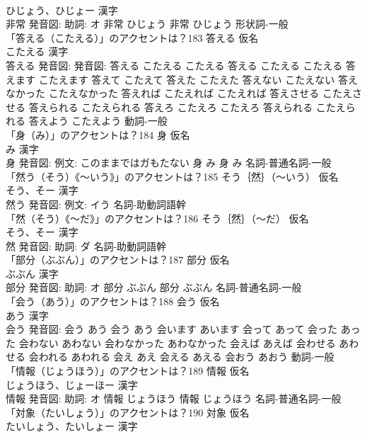 \documentclass[8pt]{extreport}
\begin{document}
\begin{CJK}{UTF8}{min}
\\	ひじょう、ひじょー 漢字　
\\	非常 発音図: 助詞: オ	非常 ひじょう		非常 ひじょう				形状詞-一般 
\\	「答える（こたえる）」のアクセントは？183	答える 仮名　
\\	こたえる 漢字　
\\	答える 発音図: 発音図:	答える こたえる こたえる		答える こたえる こたえる 答えます こたえます 答えて こたえて 答えた こたえた 答えない こたえない 答えなかった こたえなかった 答えれば こたえれば こたえれば 答えさせる こたえさせる 答えられる こたえられる 答えろ こたえろ こたえろ 答えられる こたえられる 答えよう こたえよう				動詞-一般 
\\	「身（み）」のアクセントは？184	身 仮名　
\\	み 漢字　
\\	身 発音図: 例文: このままではガもたない	身 み		身 み				名詞-普通名詞-一般 
\\	「然う（そう）《〜いう》」のアクセントは？185	そう｛然｝（〜いう） 仮名　
\\	そう、そー 漢字　
\\	然う 発音図: 例文: イう							名詞-助動詞語幹 
\\	「然（そう）《〜だ》」のアクセントは？186	そう｛然｝（〜だ） 仮名　
\\	そう、そー 漢字　
\\	然 発音図: 助詞: ダ							名詞-助動詞語幹 
\\	「部分（ぶぶん）」のアクセントは？187	部分 仮名　
\\	ぶぶん 漢字　
\\	部分 発音図: 助詞: オ	部分 ぶぶん		部分 ぶぶん				名詞-普通名詞-一般 
\\	「会う（あう）」のアクセントは？188	会う 仮名　
\\	あう 漢字　
\\	会う 発音図:	会う あう		会う あう 会います あいます 会って あって 会った あった 会わない あわない 会わなかった あわなかった 会えば あえば 会わせる あわせる 会われる あわれる 会え あえ 会える あえる 会おう あおう				動詞-一般 
\\	「情報（じょうほう）」のアクセントは？189	情報 仮名　
\\	じょうほう、じょーほー 漢字　
\\	情報 発音図: 助詞: オ	情報 じょうほう		情報 じょうほう				名詞-普通名詞-一般 
\\	「対象（たいしょう）」のアクセントは？190	対象 仮名　
\\	たいしょう、たいしょー 漢字　

\end{CJK}
\end{document}
